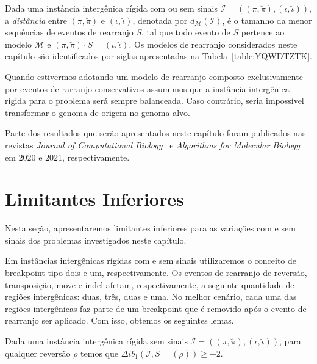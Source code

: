 Dada uma instância intergênica rígida com ou sem sinais $\mathcal{I}=((\pi,\breve\pi),(\iota,\breve\iota))$, a \emph{distância} entre $(\pi,\breve\pi)$ e $(\iota,\breve\iota)$, denotada por $d_{\mathcal{M}}(\mathcal{I})$, é o tamanho da menor sequências de eventos de rearranjo $S$, tal que todo evento de $S$ pertence ao modelo $\mathcal{M}$ e $(\pi,\breve\pi) \cdot S = (\iota,\breve\iota)$. Os modelos de rearranjo considerados neste capítulo são identificados por siglas apresentadas na Tabela~\ref{table:YQWDTZTK}.

 

Quando estivermos adotando um modelo de rearranjo composto exclusivamente por eventos de rarranjo conservativos assumimos que a instância intergênica rígida para o problema será sempre balanceada. Caso contrário, seria impossível transformar o genoma de origem no genoma alvo.

Parte dos resultados que serão apresentados neste capítulo foram publicados nas revistas \emph{Journal of Computational Biology}~\cite{2020a-brito-etal} e \emph{Algorithms for Molecular Biology}~\cite{2021b-brito-etal} em 2020 e 2021, respectivamente.

\section{Limitantes Inferiores}

Nesta seção, apresentaremos limitantes inferiores para as variações com e sem sinais dos problemas investigados neste capítulo.

Em instâncias intergênicas rígidas com e sem sinais utilizaremos o conceito de breakpoint tipo dois e um, respectivamente. Os eventos de rearranjo de reversão, transposição, move e indel afetam, respectivamente, a seguinte quantidade de regiões intergênicas: duas, três, duas e uma. No melhor cenário, cada uma das regiões intergênicas faz parte de um breakpoint que é removido após o evento de rearranjo ser aplicado. Com isso, obtemos os seguintes lemas.

\begin{lemma}\label{lemma:KFFPUBQG}
Dada uma instância intergênica rígida sem sinais $\mathcal{I}=((\pi,\breve\pi),(\iota,\breve\iota))$, para qualquer reversão $\rho$ temos que $\Delta ib_1(\mathcal{I}, S = (\rho)) \ge -2$.
\end{lemma}

